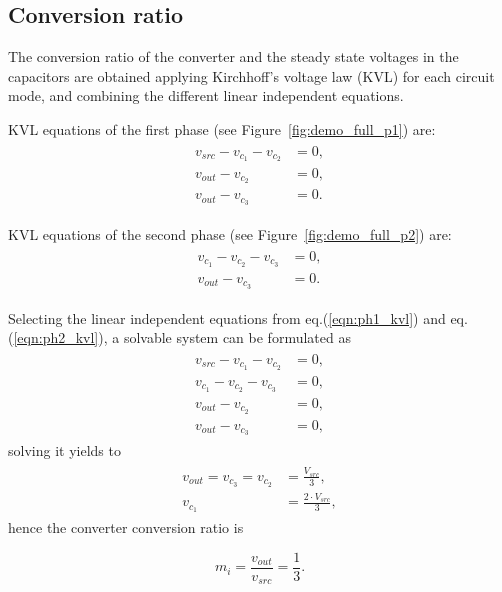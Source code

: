 \subsection{Conversion ratio}
\label{ch:conversion_ratio}
The conversion ratio of the converter and the steady state voltages in the capacitors are obtained applying Kirchhoff's voltage law (KVL) for each circuit mode, and combining the different linear independent equations.

KVL equations of the first phase (see Figure~\ref{fig:demo_full_p1}) are:
\begin{align}
\label{eqn:ph1_kvl}
\begin{split}
  v_{src} - v_{c_1} - v_{c_2} &=0, \\
  v_{out} - v_{c_2}  &=0,\\
  v_{out} - v_{c_3}  &=0.
\end{split}
\end{align}

KVL equations of the second phase (see Figure~\ref{fig:demo_full_p2}) are:
\begin{align}
\label{eqn:ph2_kvl}
\begin{split}
  v_{c_1} - v_{c_2} - v_{c_3} &=0, \\
  v_{out} - v_{c_3}  &=0.
\end{split}
\end{align}

Selecting the linear independent equations from eq.(\ref{eqn:ph1_kvl}) and eq.(\ref{eqn:ph2_kvl}), a solvable system can be formulated as
\begin{align}
\label{eqn:sys_kvl}
\begin{split}
  v_{src} - v_{c_1} - v_{c_2} &=0, \\
  v_{c_1} - v_{c_2} - v_{c_3} &=0, \\
  v_{out} - v_{c_2}  &=0,\\
  v_{out} - v_{c_3}  &=0,
\end{split}
\end{align}
solving it yields to
\begin{align}
\label{eqn:sol_kvl}
\begin{split}
  v_{out} =  v_{c_3} = v_{c_2} &=\frac{V_{src}}{3} , \\
  v_{c_1} &=\frac{2 \cdot V_{src}}{3} ,
\end{split}
\end{align}
hence the converter conversion ratio is

\begin{equation}
\label{eqn:m_kvl}
m_i = \frac{v_{out}}{v_{src}} = \frac{1}{3}.
\end{equation}

